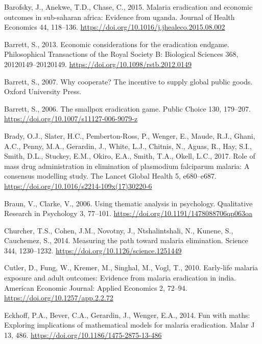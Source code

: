 \documentclass[]{article}
\begin{document}
\hypertarget{ref-Barofsky2015}{}
Barofsky, J., Anekwe, T.D., Chase, C., 2015. Malaria eradication and
economic outcomes in sub-saharan africa: Evidence from uganda. Journal
of Health Economics 44, 118--136.
\url{https://doi.org/10.1016/j.jhealeco.2015.08.002}

\hypertarget{ref-Barrett2013}{}
Barrett, S., 2013. Economic considerations for the eradication endgame.
Philosophical Transactions of the Royal Society B: Biological Sciences
368, 20120149--20120149. \url{https://doi.org/10.1098/rstb.2012.0149}

\hypertarget{ref-barrett}{}
Barrett, S., 2007. Why cooperate? The incentive to supply global public
goods. Oxford University Press.

\hypertarget{ref-Barrett_2006}{}
Barrett, S., 2006. The smallpox eradication game. Public Choice 130,
179--207. \url{https://doi.org/10.1007/s11127-006-9079-z}

\hypertarget{ref-Brady2017}{}
Brady, O.J., Slater, H.C., Pemberton-Ross, P., Wenger, E., Maude, R.J.,
Ghani, A.C., Penny, M.A., Gerardin, J., White, L.J., Chitnis, N., Aguas,
R., Hay, S.I., Smith, D.L., Stuckey, E.M., Okiro, E.A., Smith, T.A.,
Okell, L.C., 2017. Role of mass drug administration in elimination of
plasmodium falciparum malaria: A consensus modelling study. The Lancet
Global Health 5, e680--e687.
\url{https://doi.org/10.1016/s2214-109x(17)30220-6}

\hypertarget{ref-Braun2006}{}
Braun, V., Clarke, V., 2006. Using thematic analysis in psychology.
Qualitative Research in Psychology 3, 77--101.
\url{https://doi.org/10.1191/1478088706qp063oa}

\hypertarget{ref-Churcher_2014}{}
Churcher, T.S., Cohen, J.M., Novotny, J., Ntshalintshali, N., Kunene,
S., Cauchemez, S., 2014. Measuring the path toward malaria elimination.
Science 344, 1230--1232. \url{https://doi.org/10.1126/science.1251449}

\hypertarget{ref-Cutler_2010}{}
Cutler, D., Fung, W., Kremer, M., Singhal, M., Vogl, T., 2010.
Early-life malaria exposure and adult outcomes: Evidence from malaria
eradication in india. American Economic Journal: Applied Economics 2,
72--94. \url{https://doi.org/10.1257/app.2.2.72}

\hypertarget{ref-Eckhoff2014}{}
Eckhoff, P.A., Bever, C.A., Gerardin, J., Wenger, E.A., 2014. Fun with
maths: Exploring implications of mathematical models for malaria
eradication. Malar J 13, 486.
\url{https://doi.org/10.1186/1475-2875-13-486}
\end{document}
